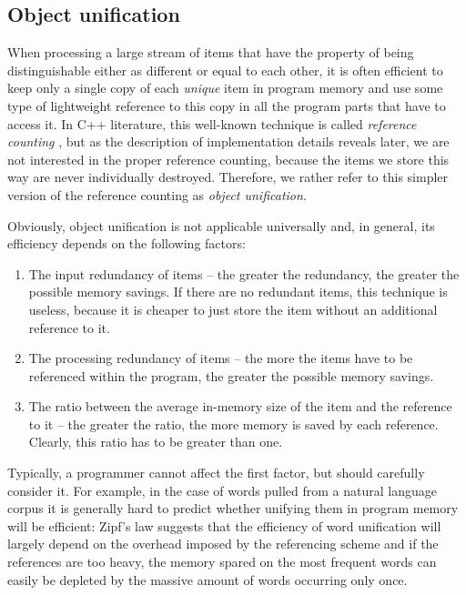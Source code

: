 \subsection{Object unification}
\label{sec:object-unification}

When processing a large stream of items that have the property of being distinguishable
either as different or equal to each other, it is often efficient to keep only a single
copy of each \emph{unique} item in program memory and use some type of lightweight
reference to this copy in all the program parts that have to access it.
In C++ literature, this well-known technique is called \emph{reference counting}
\citep[Item 29]{meyers:more-effective-cpp}, but as the description of implementation
details reveals later, we are not interested in the proper reference counting,
because the items we store this way are never individually destroyed.
Therefore, we rather refer to this simpler version of the reference counting as \emph{object
unification}.

Obviously, object unification is not applicable universally and, in general,
its efficiency depends on the following factors:
\begin{enumerate}
  \item The input redundancy of items -- the greater the redundancy, the greater
  the possible memory savings. If there are no redundant items, this technique is useless,
  because it is cheaper to just store the item without an additional reference to it.
  \item The processing redundancy of items -- the more the items have to be
  referenced within the program, the greater the possible memory savings.
  \item The ratio between the average in-memory size of the item and the reference to it -- the greater
  the ratio, the more memory is saved by each reference.
  Clearly, this ratio has to be greater than one.
\end{enumerate}

Typically, a programmer cannot affect the first factor, but should carefully consider it.
For example, in the case of words pulled from a natural language corpus it is generally hard to
predict whether unifying them in program memory will be efficient:
Zipf's law \citep[Chapter 1]{manning:stat-nlp} suggests that the efficiency of word unification
will largely depend on the overhead imposed by the referencing scheme and if the references are
too heavy, the memory spared on the most frequent words can easily be depleted by
the massive amount of words occurring only once.

